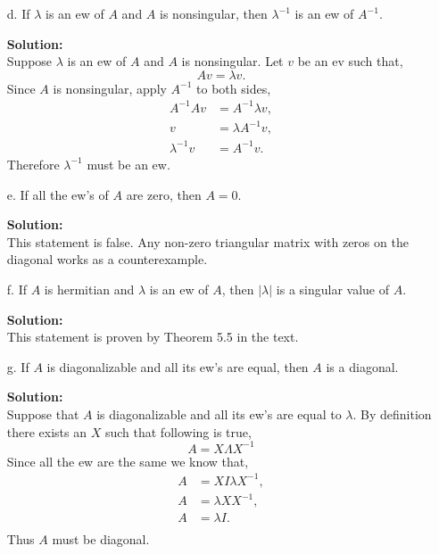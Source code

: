 \documentclass[12pt]{article}
\makeatletter
\theoremstyle{homework}
\newenvironment{exercise}[1]
{\def\@currentlabel{#1}\exercisecore}
{\endexercisecore}
\newcommand{\localhead}[1]{\par\smallskip\noindent\textbf{#1}\nobreak\\}%
\newcommand\solution{\localhead{Solution:}}
\makeatother
\begin{document}
\begin{exercise}{24.1}
\begin{enumerate}
  \item[d.] If $\lambda$ is an ew of $A$ and $A$ is nonsingular, then $\lambda^{-1}$ is an ew of $A^{-1}$.\\
  \solution Suppose $\lambda$ is an ew of $A$ and $A$ is nonsingular. Let $v$ be an ev such that, 
  \begin{equation*}
    Av = \lambda v.
  \end{equation*}
  Since $A$ is nonsingular, apply $A^{-1}$ to both sides, 
  \begin{align*}
    A^{-1}Av &= A^{-1}\lambda v,\\
    v &= \lambda A^{-1}v,\\
    \lambda^{-1}v &= A^{-1}v.
  \end{align*}
  Therefore $\lambda^{-1}$ must be an ew. 
  \vspace{.15in}

  \item[e.] If all the ew's of $A$ are zero, then $A = 0$.\\
  \solution This statement is false. Any non-zero triangular matrix with zeros on the diagonal works as a counterexample. 
  \vspace{.15in}

  \item[f.] If $A$ is hermitian and $\lambda$ is an ew of $A$, then $|\lambda|$ is a singular value of $A$.\\ 
  \solution  This statement is proven by Theorem 5.5 in the text. 
  \vspace{.15in}

  \item[g.] If $A$ is diagonalizable and all its ew's are equal, then $A$ is a diagonal. \\
  \solution Suppose that $A$ is diagonalizable and all its ew's are equal to $\lambda$. By definition there exists an $X$ such that following is true, 
  \begin{equation*}
    A = X \Lambda X^{-1}
  \end{equation*}
  Since all the ew are the same we know that, 
  \begin{align*}
    A &= X I\lambda X^{-1},\\
    A &= \lambda XX^{-1},\\
    A &= \lambda I.\\
  \end{align*}
  Thus $A$ must be diagonal. 

   

  





    





  \end{enumerate} 
  
\end{exercise}
\end{document}

